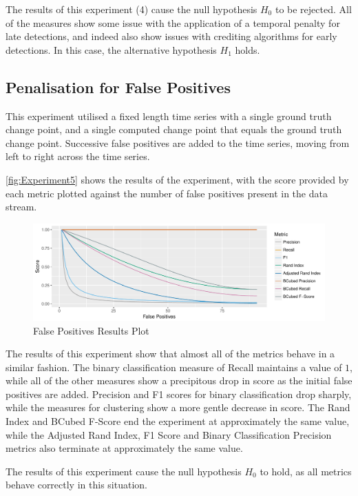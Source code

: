 \documentclass{uvamscse}	%
\begin{document}
The results of this experiment (4) cause the null hypothesis $H_0$ to be rejected. All of the measures show some issue with the application of a temporal penalty for late detections, and indeed also show issues with crediting algorithms for early detections. In this case, the alternative hypothesis $H_1$ holds.

\subsection{Penalisation for False Positives}

This experiment utilised a fixed length time series with a single ground truth change point, and a single computed change point that equals the ground truth change point. Successive false positives are added to the time series, moving from left to right across the time series.

\autoref{fig:Experiment5} shows the results of the experiment, with the score provided by each metric plotted against the number of false positives present in the data stream.

\begin{figure}[h]
    \includegraphics[width=\textwidth]{figures/Experiment5}
    \caption{False Positives Results Plot}
    \label{fig:Experiment5}
\end{figure}

The results of this experiment show that almost all of the metrics behave in a similar fashion. The binary classification measure of Recall maintains a value of $1$, while all of the other measures show a precipitous drop in score as the initial false positives are added. Precision and F1 scores for binary classification drop sharply, while the measures for clustering show a more gentle decrease in score. The Rand Index and BCubed F-Score end the experiment at approximately the same value, while the Adjusted Rand Index, F1 Score and Binary Classification Precision metrics also terminate at approximately the same value.

The results of this experiment cause the null hypothesis $H_0$ to hold, as all metrics behave correctly in this situation.
\end{document}

